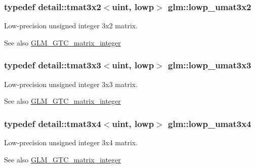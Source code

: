 \subsubsection[{\texorpdfstring{lowp\+\_\+umat3x2}{lowp_umat3x2}}]{\setlength{\rightskip}{0pt plus 5cm}typedef detail\+::tmat3x2$<$uint, lowp$>$ {\bf glm\+::lowp\+\_\+umat3x2}}\hypertarget{group__gtc__matrix__integer_ga5874e964b1816f230215df28d22ea7de}{}\label{group__gtc__matrix__integer_ga5874e964b1816f230215df28d22ea7de}
Low-\/precision unsigned integer 3x2 matrix. \begin{DoxySeeAlso}{See also}
\hyperlink{group__gtc__matrix__integer}{G\+L\+M\+\_\+\+G\+T\+C\+\_\+matrix\+\_\+integer} 
\end{DoxySeeAlso}
\subsubsection[{\texorpdfstring{lowp\+\_\+umat3x3}{lowp_umat3x3}}]{\setlength{\rightskip}{0pt plus 5cm}typedef detail\+::tmat3x3$<$uint, lowp$>$ {\bf glm\+::lowp\+\_\+umat3x3}}\hypertarget{group__gtc__matrix__integer_ga691694b1a4c6d1e613d8f1f707acc829}{}\label{group__gtc__matrix__integer_ga691694b1a4c6d1e613d8f1f707acc829}
Low-\/precision unsigned integer 3x3 matrix. \begin{DoxySeeAlso}{See also}
\hyperlink{group__gtc__matrix__integer}{G\+L\+M\+\_\+\+G\+T\+C\+\_\+matrix\+\_\+integer} 
\end{DoxySeeAlso}
\subsubsection[{\texorpdfstring{lowp\+\_\+umat3x4}{lowp_umat3x4}}]{\setlength{\rightskip}{0pt plus 5cm}typedef detail\+::tmat3x4$<$uint, lowp$>$ {\bf glm\+::lowp\+\_\+umat3x4}}\hypertarget{group__gtc__matrix__integer_gad44577fcaebad47da39cc244566d7fe3}{}\label{group__gtc__matrix__integer_gad44577fcaebad47da39cc244566d7fe3}
Low-\/precision unsigned integer 3x4 matrix. \begin{DoxySeeAlso}{See also}
\hyperlink{group__gtc__matrix__integer}{G\+L\+M\+\_\+\+G\+T\+C\+\_\+matrix\+\_\+integer} 
\end{DoxySeeAlso}
